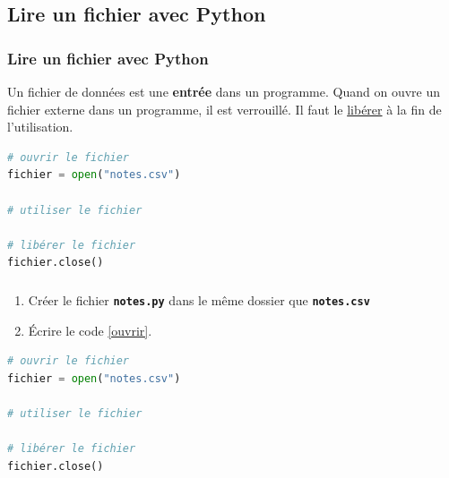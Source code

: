 \documentclass[svgnames,11pt]{beamer}
\begin{document}
\subsection{Lire un fichier avec Python}
\begin{frame}
    \frametitle{Lire un fichier avec Python}
    \begin{aretenir}[]
        Un fichier de données est une \textbf{entrée} dans un programme. Quand on ouvre un fichier externe dans un programme, il est verrouillé. Il faut le \underline{libérer} à la fin de l'utilisation.
    \end{aretenir}

\end{frame}
\begin{frame}[fragile]

    \begin{center}
        \begin{lstlisting}[language=Python , basicstyle=\ttfamily\small, xleftmargin=2em, xrightmargin=2em]
# ouvrir le fichier
fichier = open("notes.csv")

# utiliser le fichier

# libérer le fichier
fichier.close()
\end{lstlisting}
        \label{CODE}
    \end{center}
\end{frame}
\begin{frame}[fragile]
    \frametitle{}

    \begin{activite}
        \begin{enumerate}
            \item Créer le fichier \textbf{\texttt{notes.py}} dans le même dossier que \textbf{\texttt{notes.csv}}
            \item Écrire le code \ref{ouvrir}.
        \end{enumerate}
        \begin{center}
            \begin{lstlisting}[language=Python , basicstyle=\ttfamily\small, xleftmargin=2em, xrightmargin=2em]
# ouvrir le fichier
fichier = open("notes.csv")

# utiliser le fichier

# libérer le fichier
fichier.close()
\end{lstlisting}
            \label{ouvrir}
        \end{center}
    \end{activite}

\end{frame}
\end{document}
